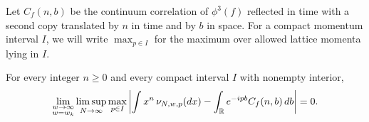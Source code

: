 Let $C_f(n,b)$ be the continuum correlation of $\phi^3(f)$ reflected in
time with a second copy translated by $n$ in time and by $b$ in space.
For a compact momentum interval $I$, we will write $\max_{p\in I}$ for
the maximum over allowed lattice momenta lying in $I$.

\begin{lemma}\label{mass:moments}
For every integer $n\ge0$ and every compact interval $I$ with nonempty
interior,
\begin{equation}\label{mass:moments-eq}
 \lim_{\substack{w\to\infty\\w=w_k}}\limsup_{N\to\infty}
 \max_{p\in I}
 \left|
   \int x^n\,\nu_{N,w,p}(dx)
   -\int_\mathbb R e^{-ipb}C_f(n,b)\,db
 \right|=0.
\end{equation}
\end{lemma}

